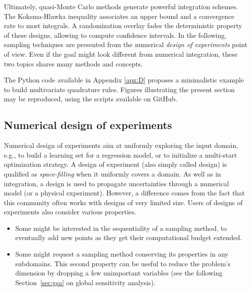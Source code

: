 Ultimately, quasi-Monte Carlo methods generate powerful integration schemes. 
The Koksma-Hlawka inequality associates an upper bound and a convergence rate to most integrals. 
A randomization overlay fades the deterministic property of these designs, allowing to compute confidence intervals. 
In the following, sampling techniques are presented from the numerical \textit{design of experiments} point of view. 
Even if the goal might look different from numerical integration, these two topics shares many methods and concepts. 


\begin{otexample}
    The Python code available in Appendix \ref{apx:D} proposes a minimalistic \ot example to build multivariate quadrature rules. 
    Figures illustrating the present section may be reproduced, using the \ot scripts available on GitHub\footnotemark.  
\end{otexample}

\subsection{Numerical design of experiments}
Numerical design of experiments aim at uniformly exploring the input domain, e.g., to build a learning set for a regression model, or to initialize a multi-start optimization strategy. 
A design of experiment (also simply called design) is qualified as \textit{space-filling} when it uniformly covers a domain. 
As well as in integration, a design is used to propagate uncertainties through a numerical model (or a physical experiment). 
However, a difference comes from the fact that this community often works with designs of very limited size. 
Users of designs of experiments also consider various properties. 
\begin{itemize}
    \item Some might be interested in the sequentiality of a sampling method, to eventually add new points as they get their computational budget extended. 
    \item Some might request a sampling method conserving its properties in any subdomains. 
    This second property can be useful to reduce the problem's dimension by dropping a few unimportant variables (see the following Section~\ref{sec:gsa} on global sensitivity analysis).
\end{itemize}

